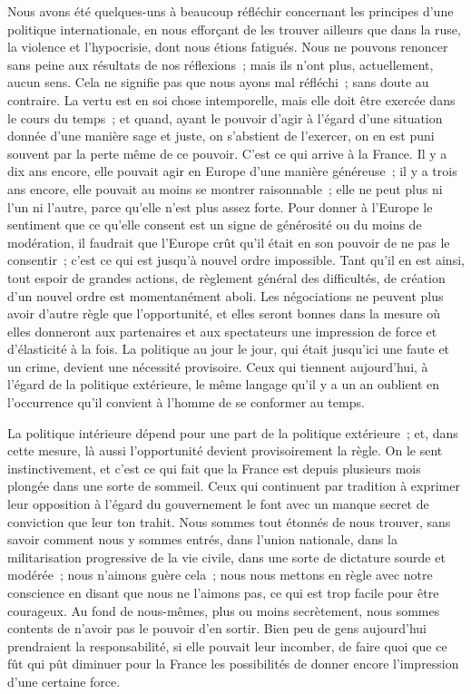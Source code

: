 \documentclass[french,twoside]{book} %
\begin{document}
Nous avons été quelques-uns à beaucoup réfléchir concernant les principes d'une politique internationale, en nous efforçant de les trouver ailleurs que dans la ruse, la violence et l'hypocrisie, dont nous étions fatigués. Nous ne pouvons renoncer sans peine aux résultats de nos réflexions ; mais ils n'ont plus, actuellement, aucun sens. Cela ne signifie pas que nous ayons mal réfléchi ; sans doute au contraire. La vertu est en soi chose intemporelle, mais elle doit être exercée dans le cours du temps ; et quand, ayant le pouvoir d'agir à l'égard d'une situation donnée d'une manière sage et juste, on s'abstient de l'exercer, on en est puni souvent par la perte même de ce pouvoir. C'est ce qui arrive à la France. Il y a dix ans encore, elle pouvait agir en Europe d'une manière généreuse ; il y a trois ans encore, elle pouvait au moins se montrer raisonnable ; elle ne peut plus ni l'un ni l'autre, parce qu'elle n'est plus assez forte. Pour donner à l'Europe le sentiment que ce qu'elle consent est un signe de générosité ou du moins de modération, il faudrait que l'Europe crût qu'il était en son pouvoir de ne pas le consentir ; c'est ce qui est jusqu'à nouvel ordre impossible. Tant qu'il en est ainsi, tout espoir de grandes actions, de règlement général des difficultés, de création d'un nouvel ordre est momen­tanément aboli. Les négociations ne peuvent plus avoir d'autre règle que l'opportunité, et elles seront bonnes dans la mesure où elles donneront aux partenaires et aux spectateurs une impression de force et d'élasticité à la fois. La politique au jour le jour, qui était jusqu'ici une faute et un crime, devient une nécessité provisoire. Ceux qui tiennent aujourd'hui, à l'égard de la poli­tique extérieure, le même langage qu'il y a un an oublient en l'occurrence qu'il convient à l'homme de se conformer au temps.\par
La politique intérieure dépend pour une part de la politique extérieure ; et, dans cette mesure, là aussi l'opportunité devient provisoirement la règle. On le sent instinctivement, et c'est ce qui fait que la France est depuis plusieurs mois plongée dans une sorte de sommeil. Ceux qui continuent par tradition à exprimer leur opposition à l'égard du gouvernement le font avec un manque secret de conviction que leur ton trahit. Nous sommes tout étonnés de nous trouver, sans savoir comment nous y sommes entrés, dans l'union nationale, dans la militarisation progressive de la vie civile, dans une sorte de dictature sourde et modérée ; nous n'aimons guère cela ; nous nous mettons en règle avec notre conscience en disant que nous ne l'aimons pas, ce qui est trop facile pour être courageux. Au fond de nous-mêmes, plus ou moins secrètement, nous sommes contents de n'avoir pas le pouvoir d'en sortir. Bien peu de gens aujourd'hui prendraient la responsabilité, si elle pouvait leur incomber, de faire quoi que ce fût qui pût diminuer pour la France les possibilités de donner encore l'impression d'une certaine force.\par
\end{document}
